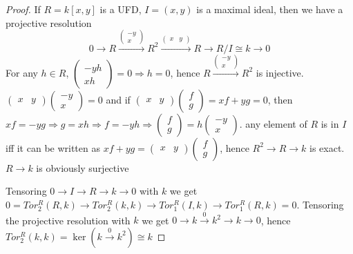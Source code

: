 \documentclass[../main.tex]{subfiles}
\begin{document}
\begin{proof}
If $R=k[x,y]$ is a UFD, $I=(x,y)$ is a maximal ideal, then we have a projective resolution
\[0\to R\xrightarrow{\begin{pmatrix}
-y\\
x
\end{pmatrix}}R^2\xrightarrow{\begin{pmatrix}
x&y
\end{pmatrix}}R\to R/I\cong k\to0\]
For any $h\in R$, $\begin{pmatrix}
-yh \\
xh
\end{pmatrix}=0\Rightarrow h=0$, hence $R\xrightarrow{\begin{pmatrix}
-y\\
x
\end{pmatrix}}R^2$ is injective. $\begin{pmatrix}
x&y
\end{pmatrix}\begin{pmatrix}
-y\\
x
\end{pmatrix}=0$ and if $\begin{pmatrix}
x&y
\end{pmatrix}\begin{pmatrix}
f\\
g
\end{pmatrix}=xf+yg=0$, then $xf=-yg\Rightarrow g=xh\Rightarrow f=-yh\Rightarrow\begin{pmatrix}
f \\
g
\end{pmatrix}=h\begin{pmatrix}
-y \\
x
\end{pmatrix}$. any element of $R$ is in $I$ iff it can be written as $xf+yg=\begin{pmatrix}
x&y
\end{pmatrix}\begin{pmatrix}
f\\
g
\end{pmatrix}$, hence $R^2\to R\to k$ is exact. $R\to k$ is obviously surjective \par
Tensoring $0\to I\to R\to k\to0$ with $k$ we get $0=Tor^R_2(R,k)\to Tor^R_2(k,k)\to Tor^R_1(I,k)\to Tor^R_1(R,k)=0$. Tensoring the projective resolution with $k$ we get $0\to k\xrightarrow{0}k^2\to k\to0$, hence $Tor^R_2(k,k)=\ker(k\xrightarrow{0}k^2)\cong k$
\end{proof}
\end{document}
